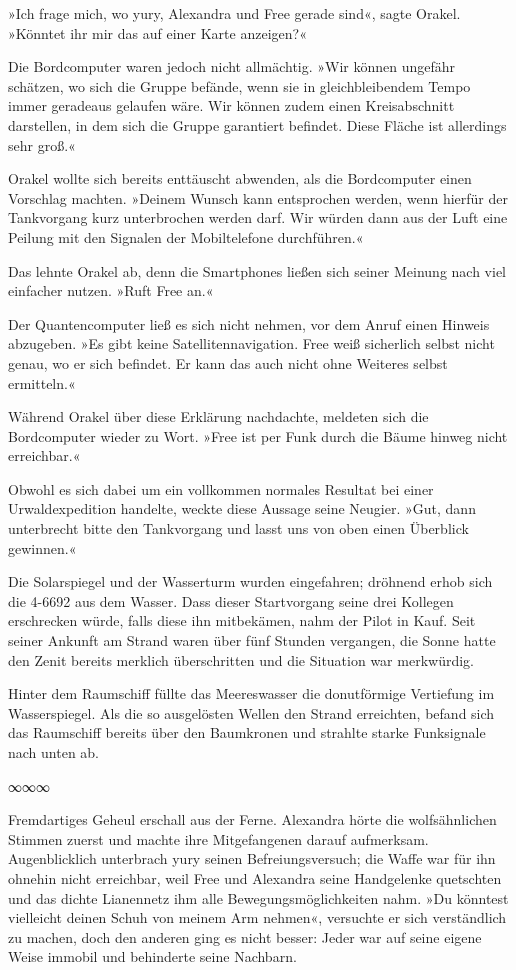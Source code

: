 »Ich frage mich, wo yury, Alexandra und Free gerade sind«, sagte Orakel. »Könntet ihr mir das auf einer Karte anzeigen?«

Die Bordcomputer waren jedoch nicht allmächtig. »Wir können ungefähr schätzen, wo sich die Gruppe befände, wenn sie in gleichbleibendem Tempo immer geradeaus gelaufen wäre. Wir können zudem einen Kreisabschnitt darstellen, in dem sich die Gruppe garantiert befindet. Diese Fläche ist allerdings sehr groß.«

Orakel wollte sich bereits enttäuscht abwenden, als die Bordcomputer einen Vorschlag machten. »Deinem Wunsch kann entsprochen werden, wenn hierfür der Tankvorgang kurz unterbrochen werden darf. Wir würden dann aus der Luft eine Peilung mit den Signalen der Mobiltelefone durchführen.«

Das lehnte Orakel ab, denn die Smartphones ließen sich seiner Meinung nach viel einfacher nutzen. »Ruft Free an.«

Der Quantencomputer ließ es sich nicht nehmen, vor dem Anruf einen Hinweis abzugeben. »Es gibt keine Satellitennavigation. Free weiß sicherlich selbst nicht genau, wo er sich befindet. Er kann das auch nicht ohne Weiteres selbst ermitteln.«

Während Orakel über diese Erklärung nachdachte, meldeten sich die Bordcomputer wieder zu Wort. »Free ist per Funk durch die Bäume hinweg nicht erreichbar.«

Obwohl es sich dabei um ein vollkommen normales Resultat bei einer Urwaldexpedition handelte, weckte diese Aussage seine Neugier. »Gut, dann unterbrecht bitte den Tankvorgang und lasst uns von oben einen Überblick gewinnen.«

Die Solarspiegel und der Wasserturm wurden eingefahren; dröhnend erhob sich die 4-6692 aus dem Wasser. Dass dieser Startvorgang seine drei Kollegen erschrecken würde, falls diese ihn mitbekämen, nahm der Pilot in Kauf. Seit seiner Ankunft am Strand waren über fünf Stunden vergangen, die Sonne hatte den Zenit bereits merklich überschritten und die Situation war merkwürdig.

Hinter dem Raumschiff füllte das Meereswasser die donutförmige Vertiefung im Wasserspiegel. Als die so ausgelösten Wellen den Strand erreichten, befand sich das Raumschiff bereits über den Baumkronen und strahlte starke Funksignale nach unten ab.

\begin{center}
∞∞∞
\end{center}

Fremdartiges Geheul erschall aus der Ferne. Alexandra hörte die wolfsähnlichen Stimmen zuerst und machte ihre Mitgefangenen darauf aufmerksam. Augenblicklich unterbrach yury seinen Befreiungsversuch; die Waffe war für ihn ohnehin nicht erreichbar, weil Free und Alexandra seine Handgelenke quetschten und das dichte Lianennetz ihm alle Bewegungsmöglichkeiten nahm. »Du könntest vielleicht deinen Schuh von meinem Arm nehmen«, versuchte er sich verständlich zu machen, doch den anderen ging es nicht besser: Jeder war auf seine eigene Weise immobil und behinderte seine Nachbarn.

